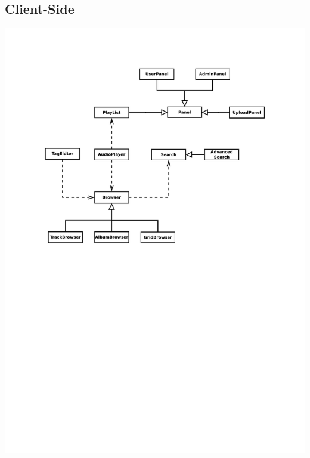 \documentclass[12pt, a4paper, oneside]{article}
\begin{document}
\newpage
\subsection{Client-Side}
\includegraphics[trim = 25mm 140mm 25mm 20mm, clip, width=\textwidth]{fig/uml_class_Client}
\end{document}
